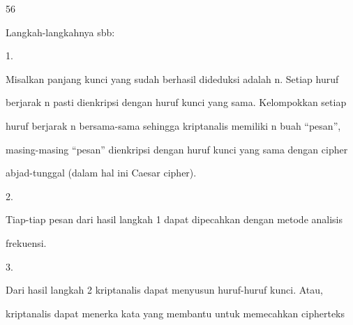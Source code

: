 \documentclass{article}
\begin{document}

56

Langkah-langkahnya sbb:

1.

Misalkan panjang kunci yang sudah berhasil dideduksi adalah n. Setiap huruf 

berjarak  n pasti dienkripsi dengan huruf kunci yang sama. Kelompokkan setiap 

huruf berjarak n bersama-sama sehingga kriptanalis memiliki n buah “pesan”, 

masing-masing “pesan” dienkripsi dengan huruf kunci yang sama dengan cipher 

abjad-tunggal (dalam hal ini Caesar cipher). 

2.

Tiap-tiap pesan dari hasil langkah 1 dapat dipecahkan dengan metode analisis 

frekuensi.

3.

Dari hasil langkah 2 kriptanalis dapat menyusun huruf-huruf kunci. Atau, 

kriptanalis dapat menerka kata yang membantu untuk memecahkan cipherteks
\end{document}
